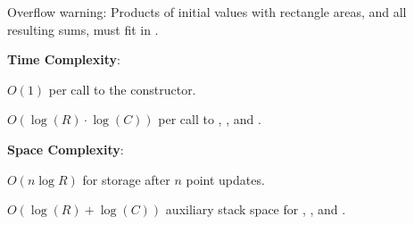 Overflow warning: Products of initial values with rectangle areas, and all resulting sums, must fit in .

\textbf{Time Complexity}:
\begin{compactitem}
  \item $O(1)$ per call to the constructor.
  \item $O(\log\left(R\right) \cdot \log\left(C\right))$ per call to , , and .
\end{compactitem}

\textbf{Space Complexity}:
\begin{compactitem}
  \item $O(n \log R)$ for storage after $n$ point updates.
  \item $O(\log\left(R\right) + \log\left(C\right))$ auxiliary stack space for , , and .
\end{compactitem}

